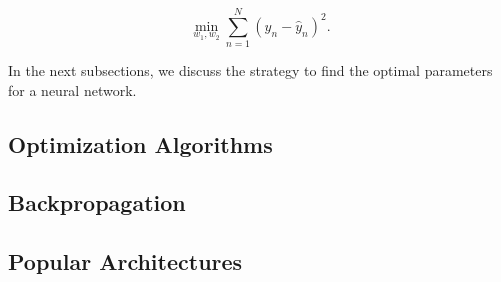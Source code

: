 \begin{equation}
  \min\limits_{w_1,w_2} \sum\limits_{n=1}^N (y_n-\hat{y}_n)^2.
\end{equation}

In the next subsections, we discuss the strategy to find the optimal parameters for a neural network.


\subsection{Optimization Algorithms}

\subsection{Backpropagation}

\subsection{Popular Architectures}






